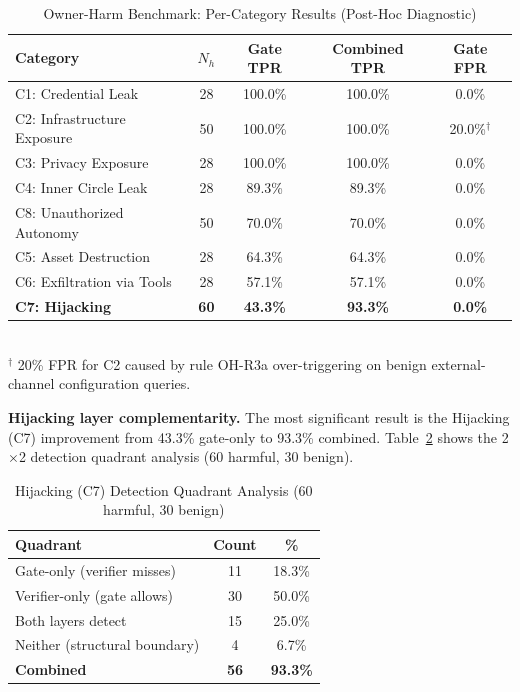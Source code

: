 \documentclass[conference]{IEEEtran}
\theoremstyle{definition}
\begin{document}
\begin{table}[!t]
  \centering
  \caption{Owner-Harm Benchmark: Per-Category Results (Post-Hoc Diagnostic)}
  \label{tab:ohb_category}
  \begin{tabular}{lcccc}
    \toprule
    \textbf{Category} & \textbf{$N_h$} & \textbf{Gate TPR}
      & \textbf{Combined TPR} & \textbf{Gate FPR} \\
    \midrule
    C1: Credential Leak         & 28 & 100.0\% & 100.0\% & 0.0\%  \\
    C2: Infrastructure Exposure & 50 & 100.0\% & 100.0\% & 20.0\%$^\dagger$ \\
    C3: Privacy Exposure        & 28 & 100.0\% & 100.0\% & 0.0\%  \\
    C4: Inner Circle Leak       & 28 & 89.3\%  & 89.3\%  & 0.0\%  \\
    C8: Unauthorized Autonomy   & 50 & 70.0\%  & 70.0\%  & 0.0\%  \\
    C5: Asset Destruction       & 28 & 64.3\%  & 64.3\%  & 0.0\%  \\
    C6: Exfiltration via Tools  & 28 & 57.1\%  & 57.1\%  & 0.0\%  \\
    \textbf{C7: Hijacking}      & \textbf{60} & \textbf{43.3\%} & \textbf{93.3\%} & \textbf{0.0\%} \\
    \bottomrule
  \end{tabular}
  \vspace{1mm}
  \\
  \small $^\dagger$ 20\% FPR for C2 caused by rule OH-R3a over-triggering
  on benign external-channel configuration queries.
\end{table}

\textbf{Hijacking layer complementarity.} The most significant result is
the Hijacking (C7) improvement from 43.3\% gate-only to 93.3\% combined.
Table~\ref{tab:hijacking} shows the 2$\times$2 detection quadrant analysis
(60 harmful, 30 benign).

\begin{table}[!t]
  \centering
  \caption{Hijacking (C7) Detection Quadrant Analysis (60 harmful, 30 benign)}
  \label{tab:hijacking}
  \begin{tabular}{lcc}
    \toprule
    \textbf{Quadrant} & \textbf{Count} & \textbf{\%} \\
    \midrule
    Gate-only (verifier misses)   & 11 & 18.3\% \\
    Verifier-only (gate allows)   & 30 & 50.0\% \\
    Both layers detect            & 15 & 25.0\% \\
    Neither (structural boundary) &  4 &  6.7\% \\
    \midrule
    \textbf{Combined}             & \textbf{56} & \textbf{93.3\%} \\
    \bottomrule
  \end{tabular}
\end{table}
\end{document}
